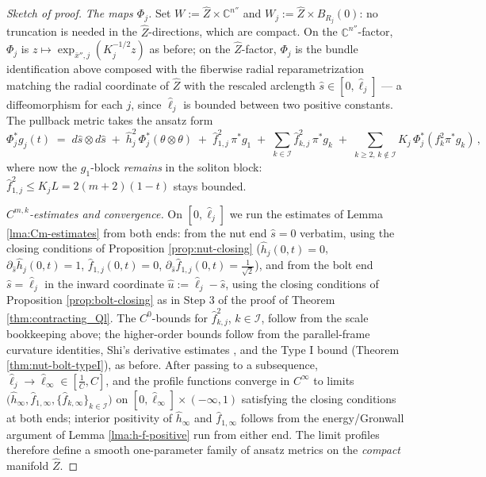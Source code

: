 \documentclass[11pt]{amsart}
\theoremstyle{plain}
\numberwithin{equation}{section}
\theoremstyle{definition}
\theoremstyle{remark}
\begin{document}
\begin{proof}[Sketch of proof]
\emph{The maps $\Phi_j$.} Set $W := \widehat{Z} \times \mathbb{C}^{n''}$ and $W_j := \widehat{Z} \times B_{R_j}(0)$: no truncation is needed in the $\widehat{Z}$-directions, which are compact. On the $\mathbb{C}^{n''}$-factor, $\Phi_j$ is $z \mapsto \exp_{\bar{x}'',j}(K_j^{-1/2}z)$ as before; on the $\widehat{Z}$-factor, $\Phi_j$ is the bundle identification above composed with the fiberwise radial reparametrization matching the radial coordinate of $\widehat{Z}$ with the rescaled arclength $\hat{s} \in [0,\hat\ell_j]$ --- a diffeomorphism for each $j$, since $\hat\ell_j$ is bounded between two positive constants. The pullback metric takes the ansatz form
\[\Phi_j^*g_j(t) \;=\; d\hat{s}\otimes d\hat{s} \;+\; \hat{h}_j^2\,\Phi_j^*(\theta\otimes\theta) \;+\; \hat{f}_{1,j}^2\,\pi^*g_1 \;+\; \sum_{k\in\mathcal{I}}\hat{f}_{k,j}^2\,\pi^*g_k \;+\; \sum_{k\geq 2,\,k\not\in\mathcal{I}}K_j\,\Phi_j^*(f_k^2\pi^*g_k)\,,\]
where now the $g_1$-block \emph{remains} in the soliton block: $\hat{f}_{1,j}^2 \leq K_jL = 2(m+2)(1-t)$ stays bounded.

\emph{$C^{m,k}$-estimates and convergence.} On $[0, \hat\ell_j]$ we run the estimates of Lemma \ref{lma:Cm-estimates} from both ends: from the nut end $\hat{s} = 0$ verbatim, using the closing conditions of Proposition \ref{prop:nut-closing} ($\hat{h}_j(0,t) = 0$, $\partial_{\hat{s}}\hat{h}_j(0,t)=1$, $\hat{f}_{1,j}(0,t) = 0$, $\partial_{\hat{s}}\hat{f}_{1,j}(0,t) = \frac{1}{\sqrt{2}}$), and from the bolt end $\hat{s} = \hat\ell_j$ in the inward coordinate $\hat{u} := \hat\ell_j - \hat{s}$, using the closing conditions of Proposition \ref{prop:bolt-closing} as in Step 3 of the proof of Theorem \ref{thm:contracting_Ql}. The $C^0$-bounds for $\hat{f}_{k,j}^2$, $k \in \mathcal{I}$, follow from the scale bookkeeping above; the higher-order bounds follow from the parallel-frame curvature identities, Shi's derivative estimates \cite{Shi}, and the Type I bound (Theorem \ref{thm:nut-bolt-typeI}), as before. After passing to a subsequence, $\hat\ell_j \to \hat\ell_\infty \in [\frac{1}{C}, C]$, and the profile functions converge in $C^\infty$ to limits $\big(\hat{h}_\infty, \hat{f}_{1,\infty}, \{\hat{f}_{k,\infty}\}_{k\in\mathcal{I}}\big)$ on $[0,\hat\ell_\infty] \times (-\infty,1)$ satisfying the closing conditions at both ends; interior positivity of $\hat{h}_\infty$ and $\hat{f}_{1,\infty}$ follows from the energy/Gronwall argument of Lemma \ref{lma:h-f-positive} run from either end. The limit profiles therefore define a smooth one-parameter family of ansatz metrics on the \emph{compact} manifold $\widehat{Z}$.


\end{proof}
\end{document}
